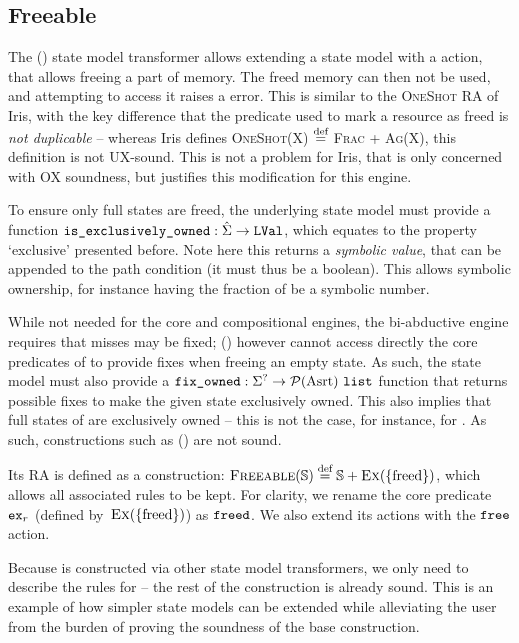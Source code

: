 \subsection{Freeable}

The \Freeable(\mmdl) state model transformer allows extending a state model with a \free{} action, that allows freeing a part of memory. The freed memory can then not be used, and attempting to access it raises a  error. This is similar to the \textsc{OneShot} RA of Iris, with the key difference that the \freedP{} predicate used to mark a resource as freed is \emph{not duplicable} -- whereas Iris defines \textsc{OneShot(X) $\stackrel{\textnormal{def}}=$ Frac + Ag(X)}, this definition is not UX-sound.  This is not a problem for Iris, that is only concerned with OX soundness, but justifies this modification for this engine.

To ensure only full states are freed, the underlying state model must provide a function ${\texttt{is\_exclusively\_owned}:\hat{\Sigma}\rightarrow\texttt{LVal}}$, which equates to the property `exclusive' presented before. Note here this returns a \emph{symbolic value}, that can be appended to the path condition (it must thus be a boolean). This allows symbolic ownership, for instance having the fraction of \Frac{} be a symbolic number.

While not needed for the core and compositional engines, the bi-abductive engine requires that  misses may be fixed; \Freeable(\mmdl) however cannot access directly the core predicates of \mmdl{} to provide fixes when freeing an empty state. As such, the state model must also provide a ${\texttt{fix\_owned}:\Sigma^?\rightarrow{\cal P}(\text{Asrt})~\texttt{list}}$ function that returns possible fixes to make the given state exclusively owned. This also implies that full states of \mmdl{} are exclusively owned -- this is not the case, for instance, for \Ag. As such, constructions such as \Freeable(\Ag) are not sound.

Its RA is defined as a construction: $\textsc{Freeable}(\mathbb S) \stackrel{\textnormal{def}}= \mathbb S + \textsc{Ex}(\{\text{freed}\})$, which allows all associated rules to be kept. For clarity, we rename the core predicate $\texttt{ex}_r$ (defined by~$\textsc{Ex}(\{\text{freed}\})$) as $\texttt{freed}$. We also extend its actions with the $\texttt{free}$ action.

Because \Freeable{} is constructed via other state model transformers, we only need to describe the rules for \free{} -- the rest of the construction is already sound. This is an example of how simpler state models can be extended while alleviating the user from the burden of proving the soundness of the base construction.


